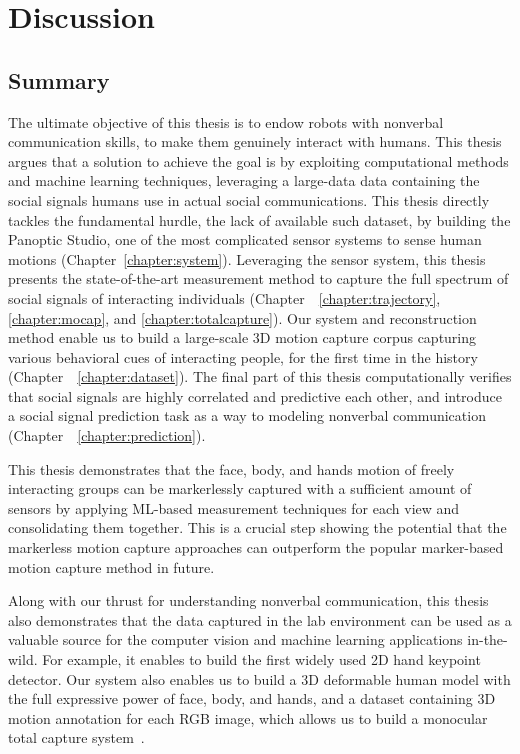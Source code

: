 \chapter{Discussion}
\label{chapter:discussion}

\section{Summary}

The ultimate objective of this thesis is to endow robots with nonverbal communication skills, to make them genuinely interact with humans. This thesis argues that a solution to achieve the goal is by exploiting computational methods and machine learning techniques, leveraging a large-data data containing the social signals humans use in actual social communications. This thesis directly tackles the fundamental hurdle, the lack of available such dataset, by building the Panoptic Studio, one of the most complicated sensor systems to sense human motions (Chapter~\ref{chapter:system}). Leveraging the sensor system, this thesis presents the state-of-the-art measurement method to capture the full spectrum of social signals of interacting individuals (Chapter~~\ref{chapter:trajectory}, \ref{chapter:mocap}, and  \ref{chapter:totalcapture}). Our system and reconstruction method enable us to build a large-scale 3D motion capture corpus capturing various behavioral cues of interacting people, for the first time in the history (Chapter~~\ref{chapter:dataset}). The final part of this thesis computationally verifies that social signals are highly correlated and predictive each other, and introduce a social signal prediction task as a way to modeling nonverbal communication (Chapter~~\ref{chapter:prediction}).

This thesis demonstrates that the face, body, and hands motion of freely interacting groups can be markerlessly captured with a sufficient amount of sensors by applying ML-based measurement techniques for each view and consolidating them together. This is a crucial step showing the potential that the markerless motion capture approaches can outperform the popular marker-based motion capture method in future. 

Along with our thrust for understanding nonverbal communication, this thesis also demonstrates that the data captured in the lab environment can be used as a valuable source for the computer vision and machine learning applications in-the-wild. For example, it enables to build the first widely used 2D hand keypoint detector\cite{simon2017hand}. Our system also enables us to build a 3D deformable human model with the full expressive power of face, body, and hands, and a dataset containing 3D motion annotation for each RGB image, which allows us to build a monocular total capture system~\cite{Xiang2019}. 



